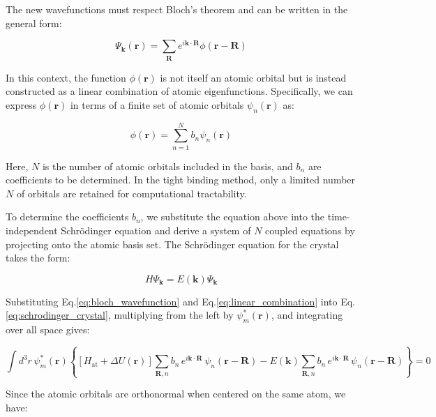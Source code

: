 The new wavefunctions must respect Bloch’s theorem and can be written in the general form:

\begin{equation}
	\Psi_{\mathbf{k}}(\mathbf{r}) = \sum_{\mathbf{R}} e^{i\mathbf{k} \cdot \mathbf{R}} \phi(\mathbf{r} - \mathbf{R})
	\label{eq:bloch_wavefunction}
\end{equation}

In this context, the function \( \phi(\mathbf{r}) \) is not itself an atomic orbital but is instead constructed as a linear combination of atomic eigenfunctions. Specifically, we can express \( \phi(\mathbf{r}) \) in terms of a finite set of atomic orbitals \( \psi_n(\mathbf{r}) \) as:

\begin{equation}
	\phi(\mathbf{r}) = \sum_{n=1}^{N} b_n \psi_n(\mathbf{r})
	\label{eq:linear_combination}
\end{equation}

\noindent
Here, \( N \) is the number of atomic orbitals included in the basis, and \( b_n \) are coefficients to be determined. In the tight binding method, only a limited number \( N \) of orbitals are retained for computational tractability.

To determine the coefficients \( b_n \), we substitute the equation above into the time-independent Schrödinger equation and derive a system of \( N \) coupled equations by projecting onto the atomic basis set. The Schrödinger equation for the crystal takes the form:

\begin{equation}
	H\Psi_{\mathbf{k}} = E(\mathbf{k}) \Psi_{\mathbf{k}}
	\label{eq:schrodinger_crystal}
\end{equation}

\noindent
Substituting Eq.\eqref{eq:bloch_wavefunction} and Eq.\eqref{eq:linear_combination}  into Eq.\eqref{eq:schrodinger_crystal}, multiplying from the left by \( \psi_m^*(\mathbf{r}) \), and integrating over all space gives:

\begin{equation}
	\int d^3 r \, \psi_m^*(\mathbf{r}) \left\{
	\left[ H_{\text{at}} + \Delta U(\mathbf{r}) \right]
	\sum_{\mathbf{R},n} b_n \, e^{i \mathbf{k} \cdot \mathbf{R}} \, \psi_n(\mathbf{r} - \mathbf{R})
	- E(\mathbf{k}) \sum_{\mathbf{R},n} b_n \, e^{i \mathbf{k} \cdot \mathbf{R}} \, \psi_n(\mathbf{r} - \mathbf{R})
	\right\} = 0
\end{equation}

\noindent
Since the atomic orbitals are orthonormal when centered on the same atom, we have:

